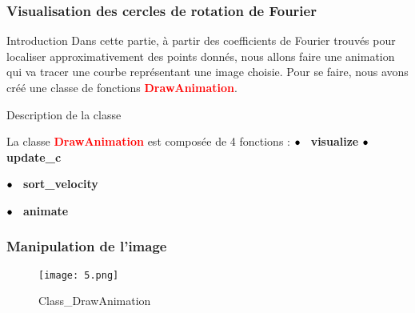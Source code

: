 \documentclass[aspectratio=169]{beamer}
\begin{document}
\begin{frame}
\frametitle{Visualisation des cercles de rotation de Fourier}

\begin{block}{Introduction}
  Dans cette partie, à partir des coefficients de Fourier trouvés pour localiser approximativement des points donnés, nous allons faire une animation qui va tracer une courbe représentant une image choisie.
  Pour se faire, nous avons créé une classe de fonctions \textcolor{red}{\textbf{DrawAnimation}}.
\end{block}

\end{frame}
\begin{frame}{Description de la classe}
\vskip 0.3cm

La classe \textcolor{red}{\textbf{DrawAnimation}} est composée de 4 fonctions :
\vskip 0.3cm
$\bullet \hspace{0.2cm}$ \textbf{visualize}
\vskip 0.3cm
$\bullet \hspace{0.2cm}$ \textbf{update\_c}
\vskip 0.3cm

$\bullet \hspace{0.2cm}$ \textbf{sort\_velocity}
\vskip 0.3cm

$\bullet \hspace{0.2cm}$ \textbf{animate}
\vskip 0.3cm

\end{frame}

\begin{frame}

  \frametitle{Manipulation de l'image }
  \begin{figure}[htpb]
        \begin{center}
            \texttt{[image: 5.png]}
            \caption{Class\_DrawAnimation}
        \end{center}
    \end{figure}


\end{frame}
\end{document}
